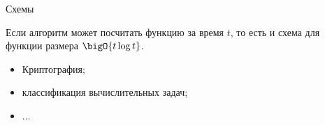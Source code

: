 \begin{frame}{Схемы}

    \begin{center}
        
    \end{center}

    \pause

    \vspace{-0.7cm}
    \begin{theorem}
        Если алгоритм может посчитать функцию за время $t$, то есть и схема для функции размера
        $\bigO{t \log t}$. 
    \end{theorem}

    \pause
    \vspace{0.1cm}
    \begin{itemize}
        \item Криптография;
        \item классификация вычислительных задач;
        \item $\ldots$
    \end{itemize}
\end{frame}

